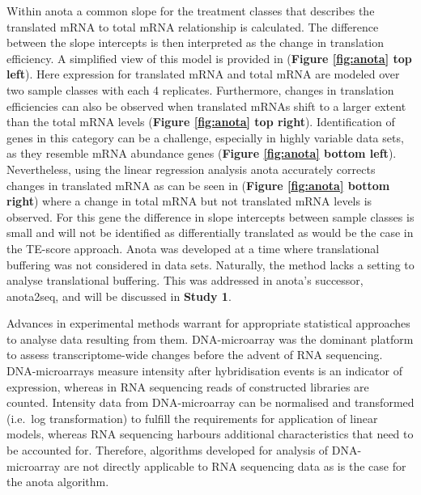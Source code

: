\documentclass[12pt,openany]{book}
\begin{document}
Within anota a common slope for the treatment classes that describes the
translated mRNA to total mRNA relationship is calculated. The difference
between the slope intercepts is then interpreted as the change in
translation efficiency. A simplified view of this model is provided in
(\textbf{Figure \ref{fig:anota} top left}). Here expression for
translated mRNA and total mRNA are modeled over two sample classes with
each 4 replicates. Furthermore, changes in translation efficiencies can
also be observed when translated mRNAs shift to a larger extent than the
total mRNA levels (\textbf{Figure \ref{fig:anota} top right}).
Identification of genes in this category can be a challenge, especially
in highly variable data sets, as they resemble mRNA abundance genes
(\textbf{Figure \ref{fig:anota} bottom left}). Nevertheless, using the
linear regression analysis anota accurately corrects changes in
translated mRNA as can be seen in (\textbf{Figure \ref{fig:anota} bottom
right}) where a change in total mRNA but not translated mRNA levels is
observed. For this gene the difference in slope intercepts between
sample classes is small and will not be identified as differentially
translated as would be the case in the TE-score approach. Anota was
developed at a time where translational buffering was not considered in
data sets. Naturally, the method lacks a setting to analyse
translational buffering. This was addressed in anota's successor,
anota2seq, and will be discussed in \textbf{Study 1}.

Advances in experimental methods warrant for appropriate statistical
approaches to analyse data resulting from them. DNA-microarray was the
dominant platform to assess transcriptome-wide changes before the advent
of RNA sequencing. DNA-microarrays measure intensity after hybridisation
events is an indicator of expression, whereas in RNA sequencing reads of
constructed libraries are counted. Intensity data from DNA-microarray
can be normalised and transformed (i.e.~log transformation) to fulfill
the requirements for application of linear models, whereas RNA
sequencing harbours additional characteristics that need to be accounted
for. Therefore, algorithms developed for analysis of DNA- microarray are
not directly applicable to RNA sequencing data as is the case for the
anota algorithm.
\end{document}

